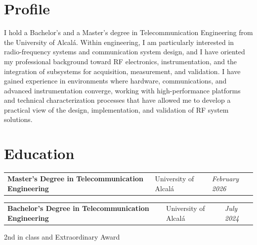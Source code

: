 \section{Profile}
\begin{onecolentry}
	I hold a Bachelor's and a Master's degree in Telecommunication Engineering from the University of Alcalá. Within engineering, I am particularly interested in radio-frequency systems and communication system design, and I have oriented my professional background toward RF electronics, instrumentation, and the integration of subsystems for acquisition, measurement, and validation. I have gained experience in environments where hardware, communications, and advanced instrumentation converge, working with high-performance platforms and technical characterization processes that have allowed me to develop a practical view of the design, implementation, and validation of RF system solutions.
\end{onecolentry}

\vspace{-5pt}

\section{Education}

\begin{onecolentry}
	\begin{tabularx}{\textwidth}{@{}>{\raggedright\arraybackslash}X>{\raggedright\arraybackslash}p{3.6cm}>{\raggedleft\arraybackslash}p{2.4cm}@{}}
		\textbf{Master's Degree in Telecommunication Engineering} & University of Alcalá & \textit{February 2026}
	\end{tabularx}

\end{onecolentry}

\vspace{0.2 cm}

\begin{onecolentry}
	\begin{tabularx}{\textwidth}{@{}>{\raggedright\arraybackslash}X>{\raggedright\arraybackslash}p{3.6cm}>{\raggedleft\arraybackslash}p{2.4cm}@{}}
		\textbf{Bachelor's Degree in Telecommunication Engineering} & University of Alcalá & \textit{July 2024}
	\end{tabularx}
	
	\vspace{0.05 cm}
	\hspace{0.2cm}2nd in class and Extraordinary Award
\end{onecolentry}

